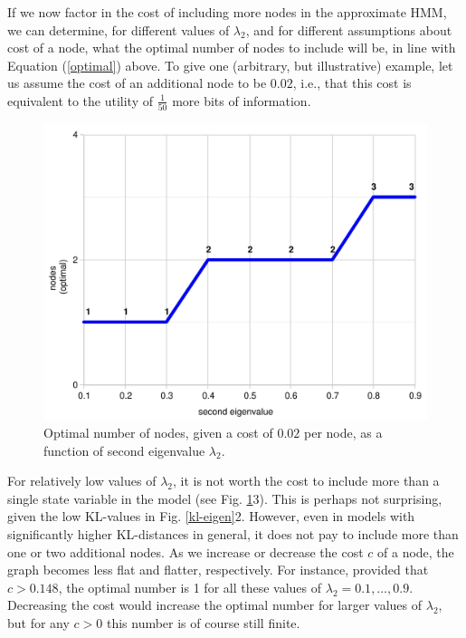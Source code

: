 \documentclass[10pt,letterpaper]{article}
\newcommand{\red}[1]{\textcolor{Red}{#1}}
\begin{document}
If we now factor in the cost of including more nodes in the approximate HMM, we can determine, for different values of $\lambda_2$, and for different assumptions about cost of a node, what the optimal number of nodes to include will be, in line with Equation (\ref{optimal}) above. To give one (arbitrary, but illustrative) example, let us assume the cost of an additional node to be $0.02$, i.e., that this cost is equivalent to the utility of $\frac{1}{50}$ more bits of information.%
 \begin{figure}[h]  \begin{center}
\includegraphics[scale=0.3]{kl-eigenvalue-7.pdf} \caption{Optimal number of nodes, given a cost of $0.02$ per node, as a function of second eigenvalue $\lambda_2$.} \end{center} 
\label{kl-eigen1}\end{figure}
For relatively low values of $\lambda_2$, it is not worth the cost to include more than a single state variable in the model (see Fig. \ref{kl-eigen1}3). This is perhaps not surprising, given the low KL-values in Fig. \ref{kl-eigen}2. However, even in models with significantly higher KL-distances in general, it does not pay to include more than one or two additional nodes. %
As we increase or decrease the cost $c$ of a node, the graph becomes less flat and flatter, respectively. For instance, provided that $c>0.148$, the optimal number is 1 for all these values of $\lambda_2 = 0.1,\dots,0.9$. Decreasing the cost would increase the optimal number for larger values of $\lambda_2$, but for any $c>0$ this number is of course still finite.
\end{document}
